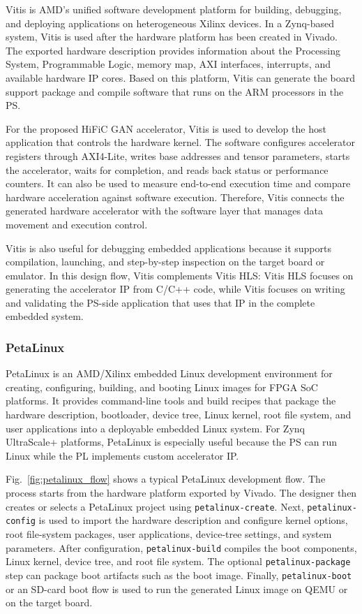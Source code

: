 Vitis is AMD's unified software development platform for building, debugging, and deploying applications on heterogeneous Xilinx devices. In a Zynq-based system, Vitis is used after the hardware platform has been created in Vivado. The exported hardware description provides information about the Processing System, Programmable Logic, memory map, AXI interfaces, interrupts, and available hardware IP cores. Based on this platform, Vitis can generate the board support package and compile software that runs on the ARM processors in the PS.

For the proposed HiFiC GAN accelerator, Vitis is used to develop the host application that controls the hardware kernel. The software configures accelerator registers through AXI4-Lite, writes base addresses and tensor parameters, starts the accelerator, waits for completion, and reads back status or performance counters. It can also be used to measure end-to-end execution time and compare hardware acceleration against software execution. Therefore, Vitis connects the generated hardware accelerator with the software layer that manages data movement and execution control.

Vitis is also useful for debugging embedded applications because it supports compilation, launching, and step-by-step inspection on the target board or emulator. In this design flow, Vitis complements Vitis HLS: Vitis HLS focuses on generating the accelerator IP from C/C++ code, while Vitis focuses on writing and validating the PS-side application that uses that IP in the complete embedded system.

\subsubsection{PetaLinux}

PetaLinux is an AMD/Xilinx embedded Linux development environment for creating, configuring, building, and booting Linux images for FPGA SoC platforms. It provides command-line tools and build recipes that package the hardware description, bootloader, device tree, Linux kernel, root file system, and user applications into a deployable embedded Linux system. For Zynq UltraScale+ platforms, PetaLinux is especially useful because the PS can run Linux while the PL implements custom accelerator IP.

Fig.~\ref{fig:petalinux_flow} shows a typical PetaLinux development flow. The process starts from the hardware platform exported by Vivado. The designer then creates or selects a PetaLinux project using \texttt{petalinux-create}. Next, \texttt{petalinux-config} is used to import the hardware description and configure kernel options, root file-system packages, user applications, device-tree settings, and system parameters. After configuration, \texttt{petalinux-build} compiles the boot components, Linux kernel, device tree, and root file system. The optional \texttt{petalinux-package} step can package boot artifacts such as the boot image. Finally, \texttt{petalinux-boot} or an SD-card boot flow is used to run the generated Linux image on QEMU or on the target board.

